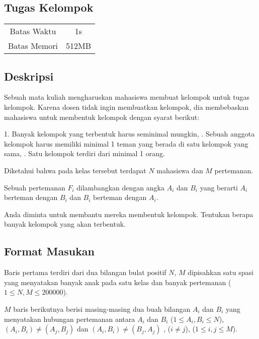 \documentclass{article}
\begin{document}
\begin{center}
    \section*{Tugas Kelompok} %

    \begin{tabular}{ | c c | }
        \hline
        Batas Waktu  & 1s \\    %
        Batas Memori & 512MB \\  %
        \hline
    \end{tabular}
\end{center}

\subsection*{Deskripsi}
Sebuah mata kuliah mengharuskan mahasiswa membuat kelompok untuk tugas kelompok. Karena dosen tidak ingin membuatkan kelompok, dia membebaskan mahasiswa untuk membentuk kelompok dengan syarat berikut:

1. Banyak kelompok yang terbentuk harus seminimal mungkin,
. Sebuah anggota kelompok harus memiliki minimal 1 teman yang berada di satu kelompok yang sama,
. Satu kelompok terdiri dari minimal 1 orang.

Diketahui bahwa pada kelas tersebut terdapat $N$ mahasiswa dan $M$ pertemanan.

Sebuah pertemanan $F_i$ dilambangkan dengan angka $A_i$ dan $B_i$ yang berarti $A_i$ berteman dengan $B_i$ dan $B_i$ berteman dengan $A_i$.

Anda diminta untuk membantu mereka membentuk kelompok. Tentukan berapa banyak kelompok yang akan terbentuk.

\subsection*{Format Masukan}

Baris pertama terdiri dari dua bilangan bulat positif $N$, $M$ dipisahkan satu spasi yang menyatakan banyak anak pada satu kelas dan banyak pertemanan ($1 \leq N, M \leq 200000$).

$M$ baris berikutnya berisi masing-masing dua buah bilangan $A_i$ dan $B_i$ yang menyatakan hubungan pertemanan antara $A_i$ dan $B_i$ ($1 \leq A_i, B_i \leq N$), $(A_i, B_i) \neq (A_j, B_j)$ dan $(A_i, B_i) \neq (B_j, A_j)$ , ($i \neq j$), ($1 \leq i, j \leq M$).
\end{document}
